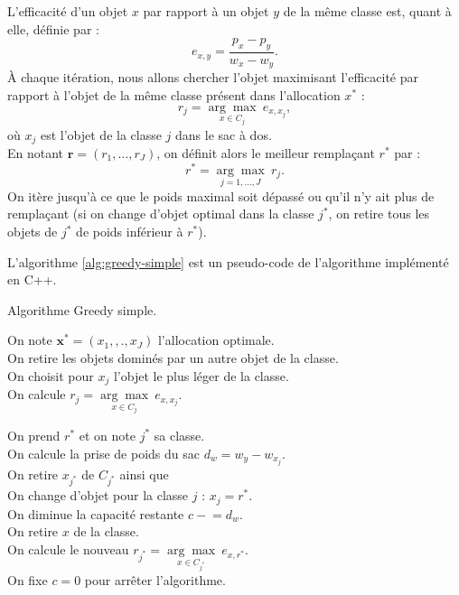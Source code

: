 \documentclass{article}
\newcommand{\minuseq}{\mathrel{-}=}
\begin{document}
L'efficacité d'un objet $x$ par rapport à un objet $y$ de la même classe est, quant à elle, définie par :
\begin{equation}\label{eq:eff}
    e_{x,y} = \frac{p_x - p_y}{w_x - w_y}.
\end{equation}
À chaque itération, nous allons chercher l'objet maximisant l'efficacité par rapport à l'objet de la même classe présent dans l'allocation $x^*$ :
\[ r_j = \underset{x\in C_j}{\arg\max}\ e_{x,x_j},\] où $x_j$ est l'objet de la classe $j$ dans le sac à dos.\\
En notant $\mathbf{r}=\left(r_1,\dots,r_J\right)$, on définit alors le meilleur remplaçant $r^*$ par :
\[ r^* = \underset{j=1,\dots,J}{\arg\max}\ r_j.\]
On itère jusqu'à ce que le poids maximal soit dépassé ou qu'il n'y ait plus de remplaçant (si on change d'objet optimal dans la classe $j^*$, on retire tous les objets de $j^*$ de poids inférieur à $r^*$). 

L'algorithme \ref{alg:greedy-simple} est un pseudo-code de l'algorithme implémenté en C++.

\begin{algorithm}[!ht]
\caption{Algorithme Greedy simple.}
\label{alg:greedy-simple}
\small
{}
	On note $\mathbf{x}^{*} = (x_1, ,., x_{J})$ l'allocation optimale.\\
	{
	    On retire les objets dominés par un autre objet de la classe.\\
	    On choisit pour $x_j$ l'objet le plus léger de la classe.\\
	    On calcule $r_j = \underset{x\in C_j}{\arg\max}\ e_{x,x_j}$.
	}
	
	{
	    On prend $r^*$ et on note $j^*$ sa classe.\\
	    On calcule la prise de poids du sac $d_w = w_y-w_{x_j}$.\\
		{
			On retire $x_{j^*}$ de $C_{j^*}$ ainsi que\\
			On change d'objet pour la classe $j$ : $x_j = r^*$.\\
			On diminue la capacité restante $c \minuseq d_w$.\\

			{
				{
					On retire $x$ de la classe.\\
				}
			}
			On calcule le nouveau $r_{j^*} = \underset{x\in C_{j^*}}{\arg\max}\ e_{x,r^*}$. \\
		}
	    {
	    On fixe $c=0$ pour arrêter l'algorithme.
	    }
	}
\end{algorithm}
\newpage
\end{document}
